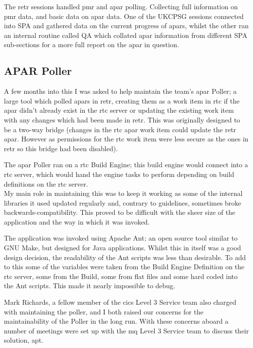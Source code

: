 \documentclass[a4paper,11pt]{report}
\begin{document}
The \gls{retr} sessions handled \gls{pmr} and \gls{apar} polling. Collecting full information on
\gls{pmr} data, and basic data on \gls{apar} data. One of the UKCPSG sessions connected into SPA 
and gathered data on the current progress of \gls{apar}s, whilst the other ran an internal routine 
called QA which collated \gls{apar} information from different SPA sub-sections for a more full
report on the \gls{apar} in question. \\



\subsection{APAR Poller}

A few months into this I was asked to help maintain the team's \gls{apar} Poller; a large tool 
which polled \gls{apar}s in \gls{retr}, creating them as a work item in \gls{rtc} if the \gls{apar}
didn't already exist in the \gls{rtc} server or updating the existing work item with any changes
which had been made in \gls{retr}. This was originally designed to be a two-way bridge (changes in
the \gls{rtc} \gls{apar} work item could update the \gls{retr} \gls{apar}. However as permissions
for the \gls{rtc} work item were less secure as the ones in \gls{retr} so this bridge had been 
disabled).

The \gls{apar} Poller ran on a \gls{rtc} Build Engine; this build engine would connect into a 
\gls{rtc} server, which would hand the engine tasks to perform depending on build definitions on
the \gls{rtc} server. \\



My main role in maintaining this was to keep it working as some of the internal libraries it used
updated regularly and, contrary to guidelines, sometimes broke backwards-compatibility. This 
proved to be difficult with the sheer size of the application and the way in which it was invoked.

The application was invoked using Apache Ant; an open source tool similar to GNU Make, but designed
for Java applications. Whilst this in itself was a good design decision, the readability of the 
Ant scripts was less than desirable. To add to this some of the variables were taken from the 
Build Engine Definition on the \gls{rtc} server, some from the Build, some from flat files and some
hard coded into the Ant scripts. This made it nearly impossible to debug.

Mark Richards, a fellow member of the \gls{cics} Level 3 Service team also charged with maintaining
the poller, and I both raised our concerns for the maintainability of the Poller in the long run.
With these concerns aboard a number of meetings were set up with the \gls{mq} Level 3 Service team
to discuss their solution, \gls{apt}.
\end{document}
